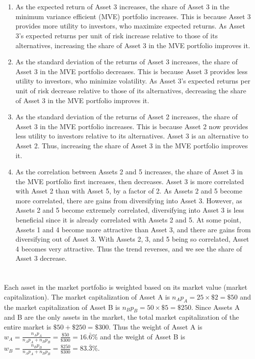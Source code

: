 \documentclass[12pt]{article}
\begin{document}
\section{}
\begin{enumerate}
    \item As the expected return of Asset 3 increases, the share of Asset 3 in the minimum variance efficient (MVE) portfolio increases. This is because Asset 3 provides more utility to investors, who maximize expected returns. As Asset 3's expected returns per unit of risk increase relative to those of its alternatives, increasing the share of Asset 3 in the MVE portfolio improves it. 
    \item As the standard deviation of the returns of Asset 3 increases, the share of Asset 3 in the MVE portfolio decreases. This is because Asset 3 provides less utility to investors, who minimize volatility. As Asset 3's expected returns per unit of risk decrease relative to those of its alternatives, decreasing the share of Asset 3 in the MVE portfolio improves it.
    \item As the standard deviation of the returns of Asset 2 increases, the share of Asset 3 in the MVE portfolio increases. This is because Asset 2 now provides less utility to investors relative to its alternatives. Asset 3 is an alternative to Asset 2. Thus, increasing the share of Asset 3 in the MVE portfolio improves it.
    \item As the correlation between Assets 2 and 5 increases, the share of Asset 3 in the MVE portfolio first increases, then decreases. Asset 3 is more correlated with Asset 2 than with Asset 5, by a factor of 2. As Assets 2 and 5 become more correlated, there are gains from diversifying into Asset 3. However, as Assets 2 and 5 become extremely correlated, diversifying into Asset 3 is less beneficial since it is already correlated with Assets 2 and 5. At some point, Assets 1 and 4 become more attractive than Asset 3, and there are gains from diversifying out of Asset 3. With Assets 2, 3, and 5 being so correlated, Asset 4 becomes very attractive. Thus the trend reverses, and we see the share of Asset 3 decrease.
\end{enumerate}
\section{}
Each asset in the market portfolio is weighted based on its market value (market capitalization). The market capitalization of Asset A is $n_Ap_A=25\times\$2=\$50$ and the market capitalization of Asset B is $n_Bp_B=50\times\$5=\$250$. Since Assets A and B are the only assets in the market, the total market capitalization of the entire market is $\$50+\$250=\$300$. Thus the weight of Asset A is $w_A=\frac{n_Ap_A}{n_Ap_A+n_Bp_B}=\frac{\$50}{\$300}=16.\bar{6}\%$ and the weight of Asset B is $w_B=\frac{n_Bp_B}{n_Ap_A+n_Bp_B}=\frac{\$250}{\$300}=83.\bar{3}\%$.
\end{document}
